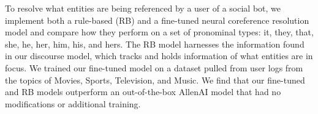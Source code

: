 To resolve what entities are being referenced by a user of a social bot, we implement both a rule-based (RB) and a fine-tuned neural coreference resolution model and compare how they perform on a set of pronominal types: it, they, that, she, he, her, him, his, and hers. The RB model harnesses the information found in our discourse model, which tracks and holds information of what entities are in focus. We trained our fine-tuned model on a dataset pulled from user logs from the topics of Movies, Sports, Television, and Music.  We find that our fine-tuned and RB models outperform an out-of-the-box AllenAI model that had no modifications or additional training.
